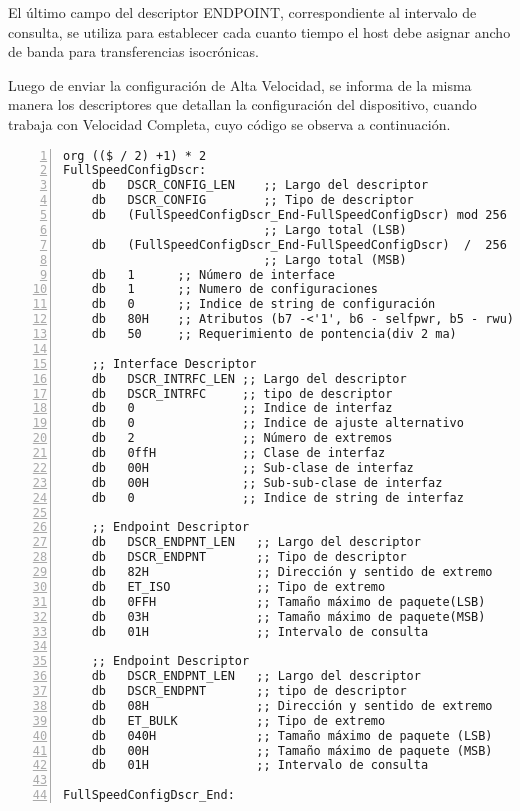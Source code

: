 	El último campo del descriptor ENDPOINT, correspondiente al intervalo de consulta, se utiliza para establecer cada cuanto tiempo el host debe asignar ancho de banda para transferencias isocrónicas.
	
	Luego de enviar la configuración de Alta Velocidad, se informa de la misma manera los descriptores que detallan la configuración del dispositivo, cuando trabaja con Velocidad Completa, cuyo código se observa a continuación.
	
	\begin{lstlisting}[language={[x86masm]Assembler},backgroundcolor=\color{gray!30},numbers=left]
org (($ / 2) +1) * 2
FullSpeedConfigDscr:
	db   DSCR_CONFIG_LEN	;; Largo del descriptor
	db   DSCR_CONFIG        ;; Tipo de descriptor
	db   (FullSpeedConfigDscr_End-FullSpeedConfigDscr) mod 256
							;; Largo total (LSB)
	db   (FullSpeedConfigDscr_End-FullSpeedConfigDscr)  /  256 
							;; Largo total (MSB)
	db   1      ;; Número de interface
	db   1      ;; Numero de configuraciones
	db   0      ;; Indice de string de configuración
	db   80H    ;; Atributos (b7 -<'1', b6 - selfpwr, b5 - rwu)
	db   50     ;; Requerimiento de pontencia(div 2 ma)
	
	;; Interface Descriptor
	db   DSCR_INTRFC_LEN ;; Largo del descriptor
	db   DSCR_INTRFC     ;; tipo de descriptor
	db   0               ;; Indice de interfaz
	db   0               ;; Indice de ajuste alternativo
	db   2               ;; Número de extremos
	db   0ffH            ;; Clase de interfaz
	db   00H             ;; Sub-clase de interfaz
	db   00H             ;; Sub-sub-clase de interfaz
	db   0               ;; Indice de string de interfaz
	
	;; Endpoint Descriptor
	db   DSCR_ENDPNT_LEN   ;; Largo del descriptor
	db   DSCR_ENDPNT       ;; Tipo de descriptor
	db   82H               ;; Dirección y sentido de extremo
	db   ET_ISO            ;; Tipo de extremo
	db   0FFH              ;; Tamaño máximo de paquete(LSB)
	db   03H               ;; Tamaño máximo de paquete(MSB)
	db   01H               ;; Intervalo de consulta
	
	;; Endpoint Descriptor
	db   DSCR_ENDPNT_LEN   ;; Largo del descriptor
	db   DSCR_ENDPNT       ;; tipo de descriptor
	db   08H               ;; Dirección y sentido de extremo
	db   ET_BULK           ;; Tipo de extremo
	db   040H              ;; Tamaño máximo de paquete (LSB)
	db   00H               ;; Tamaño máximo de paquete (MSB)
	db   01H               ;; Intervalo de consulta
	
FullSpeedConfigDscr_End:
	\end{lstlisting}

